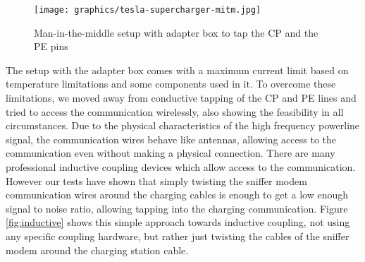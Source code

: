 \documentclass[sigconf]{acmart}
\begin{document}
\begin{figure}[ht]
    \centering
    \texttt{[image: graphics/tesla-supercharger-mitm.jpg]}
    \caption{Man-in-the-middle setup with adapter box to tap the CP and the PE pins}
    \label{fig:supercharger}
\end{figure}

The setup with the adapter box comes with a maximum current limit based on temperature limitations and some components used in it. To overcome these limitations, we moved away from conductive tapping of the CP and PE lines and tried to access the communication wirelessly, also showing the feasibility in all circumstances.
Due to the physical characteristics of the high frequency powerline signal, the communication wires behave like antennas, allowing access to the communication even without making a physical connection.
There are many professional inductive coupling devices which allow access to the communication. However our tests have shown that simply twisting the sniffer modem communication wires around the charging cables is enough to get a low enough signal to noise ratio, allowing tapping into the charging communication.
Figure \ref{fig:inductive} shows this simple approach towards inductive coupling, not using any specific coupling hardware, but rather just twisting the cables of the sniffer modem around the charging station cable.
\end{document}
